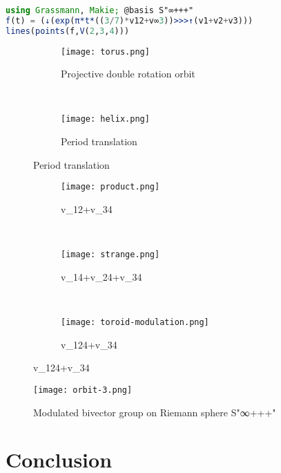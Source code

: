 \documentclass{juliacon}
\DeclareMathOperator*{\obackslash}{\text{\reflectbox{$\oslash$}}}
\begin{document}
\begin{lstlisting}[language = Julia]
using Grassmann, Makie; @basis S"∞+++"
f(t) = (↓(exp(π*t*((3/7)*v12+v∞3))>>>↑(v1+v2+v3)))
lines(points(f,V(2,3,4)))
\end{lstlisting}
\begin{figure}[ht]
	\centering
	\begin{subfigure}[b]{0.3\textwidth}
		\texttt{[image: torus.png]}
		\caption{Projective double rotation orbit}
	\end{subfigure}
	~
	\begin{subfigure}[b]{0.15\textwidth}
		\texttt{[image: helix.png]}
		\caption{Period translation}
	\end{subfigure}
\end{figure}

\begin{figure}[t]
	\centering
	\caption{Different variations of bivectors in $\mb R^4$ discrete topology.}
	\begin{subfigure}[b]{0.14\textwidth}
		\texttt{[image: product.png]}
		\caption{v_{12}+v_{34}}
	\end{subfigure}
	~
	\begin{subfigure}[b]{0.14\textwidth}
		\texttt{[image: strange.png]}
		\caption{v_{14}+v_{24}+v_{34}}
	\end{subfigure}
	~
	\begin{subfigure}[b]{0.14\textwidth}
		\texttt{[image: toroid-modulation.png]}
		\caption{v_{124}+v_{34}}
	\end{subfigure}
\end{figure}

\begin{figure}[t]
\centerline{\texttt{[image: orbit-3.png]}}
\caption{Modulated bivector group on Riemann sphere S"∞+++"}
\end{figure}

\section{Conclusion}
\end{document}
